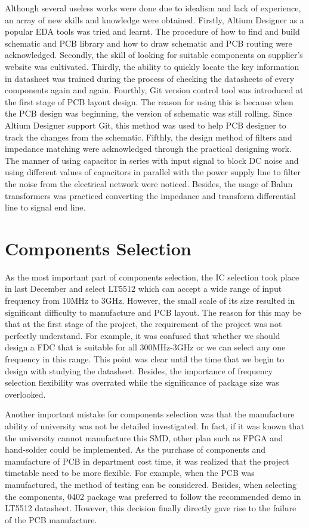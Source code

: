 \documentclass[12pt, a4paper]{report}
\begin{document}
Although several useless works were done due to idealism and lack of experience, an array of new skills and knowledge were obtained. Firstly, Altium Designer as a popular EDA tools was tried and learnt. The procedure of how to find and build schematic and PCB library and how to draw schematic and PCB routing were acknowledged. Secondly, the skill of looking for suitable components on supplier's website was cultivated. Thirdly, the ability to quickly locate the key information in datasheet was trained during the process of checking the datasheets of every components again and again. Fourthly, Git version control tool was introduced at the first stage of PCB layout design. The reason for using this is because when the PCB design was beginning, the version of schematic was still rolling. Since Altium Designer support Git, this method was used to help PCB designer to track the changes from the schematic. Fifthly, the design method of filters and impedance matching were acknowledged through the practical designing work. The manner of using capacitor in series with input signal to block DC noise and using different values of capacitors in parallel with the power supply line to filter the noise from the electrical network were noticed. Besides, the usage of Balun transformers was practiced converting the impedance and transform differential line to signal end line. 

\section{Components Selection}

As the most important part of components selection, the IC selection took place in last December and select LT5512 which can accept a wide range of input frequency from 10MHz to 3GHz. However, the small scale of its size resulted in significant difficulty to manufacture and PCB layout. The reason for this may be that at the first stage of the project, the requirement of the project was not perfectly understand. For example, it was confused that whether we should design a FDC that is suitable for all 300MHz-3GHz or we can select any one frequency in this range. This point was clear until the time that we begin to design with studying the datasheet. Besides, the importance of frequency selection flexibility was overrated while the significance of package size was overlooked.

Another important mistake for components selection was that the manufacture ability of university was not be detailed investigated. In fact, if it was known that the university cannot manufacture this SMD, other plan such as FPGA and hand-solder could be implemented. As the purchase of components and manufacture of PCB in department cost time, it was realized that the project timetable need to be more flexible. For example, when the PCB was manufactured, the method of testing can be considered. Besides, when selecting the components, 0402 package was preferred to follow the recommended demo in LT5512 datasheet\cite{ref:LT5512}. However, this decision finally directly gave rise to the failure of the PCB manufacture.
\end{document}
